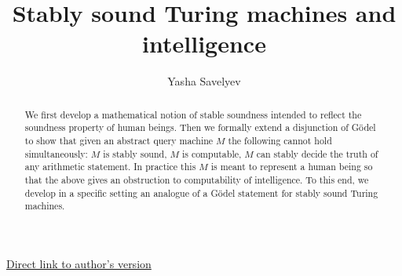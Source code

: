 \documentclass{amsart}  %
\numberwithin{equation}{section}
\theoremstyle{definition}
\theoremstyle{remark}
\begin{document}
\title {Stably sound Turing machines and intelligence} 
\author{Yasha Savelyev} 
\href{http://yashamon.github.io/web2/papers/immitation.pdf} {Direct link to author's version}
\address{University of Colima, Department of Sciences, CUICBAS}
\begin{abstract}
We first develop a mathematical notion of stable soundness intended to reflect the soundness property of human beings. Then we formally extend a disjunction of G\"odel to show that given an abstract query machine $M$ the following cannot hold simultaneously: $M$ is stably sound, $M$ is computable, $M$ can stably decide the truth of any arithmetic statement. In practice this $M$ is meant to represent a human being so that the above gives an obstruction to computability of intelligence. To this end, we develop in a specific setting an analogue of a G\"odel statement for stably sound Turing machines.  
\end{abstract}
\maketitle
%
\end{document}
